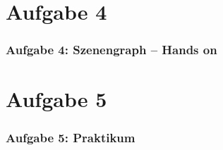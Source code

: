 \documentclass[accentcolor=tud9c,colorbacktitle,inverttitle,landscape,german,presentation,t]{tudbeamer}
\begin{document}
\section{Aufgabe 4}
\begin{frame}
	\frametitle{Aufgabe 4: Szenengraph – Hands on}
\end{frame}

\section{Aufgabe 5}
\begin{frame}
	\frametitle{Aufgabe 5: Praktikum}
\end{frame}
\end{document}
